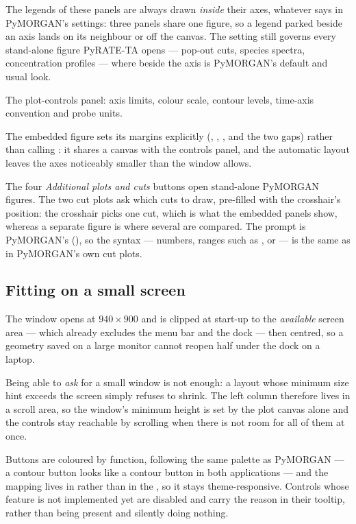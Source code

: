 \begin{description}
    The legends of these panels are always drawn \emph{inside} their axes,
    whatever  says in PyMORGAN's settings: three
    panels share one figure, so a legend parked beside an axis lands on its
    neighbour or off the canvas. The setting still governs every stand-alone
    figure PyRATE-TA opens --- pop-out cuts, species spectra, concentration
    profiles --- where beside the axis is PyMORGAN's default and usual look.
  \item[Bottom] The plot-controls panel: axis limits, colour scale, contour
    levels, time-axis convention and probe units.
\end{description}

The embedded figure sets its margins explicitly (,
, ,  and the two gaps)
rather than calling : it shares a canvas with the controls
panel, and the automatic layout leaves the axes noticeably smaller than the
window allows.

The four \emph{Additional plots and cuts} buttons open stand-alone PyMORGAN
figures. The two cut plots ask which cuts to draw, pre-filled with the
crosshair's position: the crosshair picks one cut, which is what the embedded
panels show, whereas a separate figure is where several are compared. The
prompt is PyMORGAN's (), so the syntax ---
numbers, ranges such as , or  --- is the same as in
PyMORGAN's own cut plots.

\subsection{Fitting on a small screen}

The window opens at $940 \times 900$ and is clipped at start-up to the
\emph{available} screen area --- which already excludes the menu bar and the
dock --- then centred, so a geometry saved on a large monitor cannot reopen
half under the dock on a laptop.

Being able to \emph{ask} for a small window is not enough: a layout whose
minimum size hint exceeds the screen simply refuses to shrink. The left column
therefore lives in a scroll area, so the window's minimum height is set by the
plot canvas alone and the controls stay reachable by scrolling when there is not
room for all of them at once.

Buttons are coloured by function, following the same palette as PyMORGAN --- a
contour button looks like a contour button in both applications --- and the
mapping lives in  rather than in the , so it
stays theme-responsive. Controls whose feature is not implemented yet are
disabled and carry the reason in their tooltip, rather than being present and
silently doing nothing.

